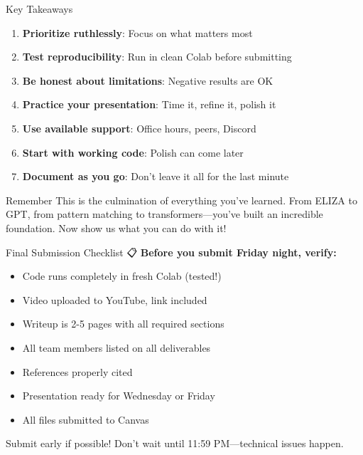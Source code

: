 \documentclass[aspectratio=169]{beamer}
\begin{document}
\begin{frame}[shrink=10]{Key Takeaways 🔑}
\begin{enumerate}\setlength{\itemsep}{0pt}
    \item \textbf{Prioritize ruthlessly}: Focus on what matters most
    \item \textbf{Test reproducibility}: Run in clean Colab before submitting
    \item \textbf{Be honest about limitations}: Negative results are OK
    \item \textbf{Practice your presentation}: Time it, refine it, polish it
    \item \textbf{Use available support}: Office hours, peers, Discord
    \item \textbf{Start with working code}: Polish can come later
    \item \textbf{Document as you go}: Don't leave it all for the last minute
\end{enumerate}

\vspace{0.3cm}

\begin{alertblock}{Remember}
This is the culmination of everything you've learned. From ELIZA to GPT, from pattern matching to transformers—you've built an incredible foundation. Now show us what you can do with it!
\end{alertblock}
\end{frame}

\begin{frame}[shrink=10]{Final Submission Checklist 📋}
\textbf{Before you submit Friday night, verify:}
\begin{itemize}\setlength{\itemsep}{0pt}
    \item[$\square$] Code runs completely in fresh Colab (tested!)
    \item[$\square$] Video uploaded to YouTube, link included
    \item[$\square$] Writeup is 2-5 pages with all required sections
    \item[$\square$] All team members listed on all deliverables
    \item[$\square$] References properly cited
    \item[$\square$] Presentation ready for Wednesday or Friday
    \item[$\square$] All files submitted to Canvas
\end{itemize}

\vspace{0.3cm}

\begin{protip}
Submit early if possible! Don't wait until 11:59 PM—technical issues happen.
\end{protip}
\end{frame}
\end{document}
